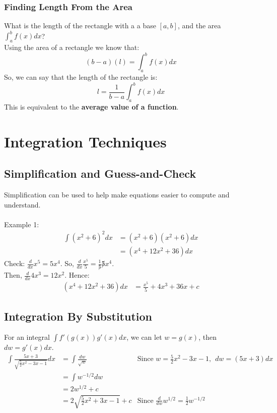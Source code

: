 \documentclass{article}
\begin{document}
\subsubsection{Finding Length From the Area}
What is the length of the rectangle with a a base $[a,b]$, and the area $\int_a^b f(x)dx$?\\
Using the area of a rectangle we know that:
$$(b-a)(l) = \int_a^b f(x)dx$$
So, we can say that the length of the rectangle is:
$$l = \frac{1}{b-a}\int_a^b f(x)dx$$
This is equivalent to the \textbf{average value of a function}.

\section{Integration Techniques}
\subsection{Simplification and Guess-and-Check}
Simplification can be used to help make equations easier to compute and understand.\\
\\
Example 1:
\begin{align*}
    \int (x^2 + 6)^2 dx & = (x^2 + 6)(x^2 + 6) dx\\
    & = (x^4 + 12x^2 + 36) dx
\end{align*}
Check: $\frac{d}{dx} x^5 = 5x^4$. So, $\frac{d}{dx} \frac{x^5}{5} = \frac{1}{\not 5}\not 5 x^4$.\\
Then, $\frac{d}{dx} 4x^3 = 12x^2$. Hence:
\begin{align*}
    (x^4 + 12x^2 + 36) dx & = \frac{x^5}{5} + 4x^3 + 36x + c
\end{align*}

\subsection{Integration By Substitution}
For an integral $\int f'(g(x))g'(x) dx$, we can let $w = g(x)$, then $dw = g'(x) dx$.
\begin{align*}
    \int \frac{5x + 3}{\sqrt{\frac{5}{2}x^2 - 3x - 1}} dx & = \int \frac{dw}{\sqrt{w}} & \text{Since } w = \frac{5}{2}x^2 - 3x - 1, \ \ dw = (5x+3) dx\\
    & = \int w^{-1/2}dw\\
    & = 2w^{1/2} + c\\
    & = 2\sqrt{\frac{5}{2} x^2 + 3x - 1} + c & \text{Since }\frac{d}{dw} w^{1/2} = \frac{1}{2}w^{-1/2}
\end{align*}
\end{document}
